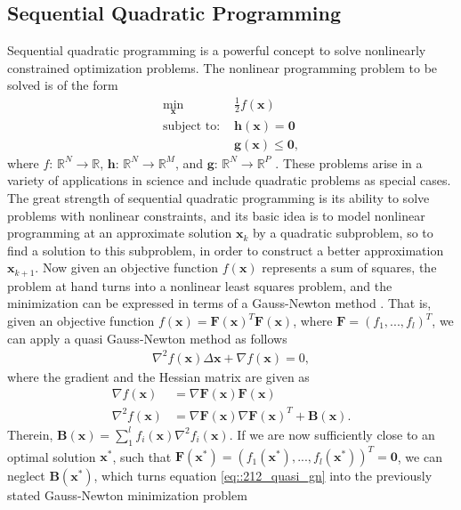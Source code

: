 \subsection{Sequential Quadratic Programming}
\label{sec::212_sqp}
Sequential quadratic programming is a powerful concept to solve nonlinearly constrained optimization problems. The nonlinear programming problem to be solved is of the form
\begin{align}
	\min_{\bm{x}}\, &\frac{1}{2}f(\bm{x})
	\label{eq::212_objective}\\
	\text{subject to: } &\bm{h}(\bm{x}) = \bm{0}\\
	&\bm{g}(\bm{x}) \leq \bm{0},
\end{align}
where $f:\,\mathbb{R}^N\rightarrow\mathbb{R}$, $\bm{h}:\,\mathbb{R}^N\rightarrow\mathbb{R}^M$, and $\bm{g}:\,\mathbb{R}^N\rightarrow\mathbb{R}^P$ \cite{boggs1995sequential}. These problems arise in a variety of applications in science and include quadratic problems as special cases. The great strength of sequential quadratic programming is its ability to solve problems with nonlinear constraints, and its basic idea is to model nonlinear programming at an approximate solution $\bm{x}_k$ by a quadratic subproblem, so to find a solution to this subproblem, in order to construct a better approximation $\bm{x}_{k+1}$. Now given an objective function $f(\bm{x})$ represents a sum of squares, the problem at hand turns into a nonlinear least squares problem, and the minimization can be expressed in terms of a Gauss-Newton method \cite{schittkowski1988solving}. That is, given an objective function $f(\bm{x}) = \bm{F}(\bm{x})^T\bm{F}(\bm{x})$, where $\bm{F}=\left(f_1,...,f_l\right)^T$, we can apply a quasi Gauss-Newton method as follows
\begin{align}
	\nabla^2f(\bm{x})\Delta\bm{x} + \nabla f(\bm{x}) = 0,
	\label{eq::212_quasi_gn}
\end{align}
where the gradient and the Hessian matrix are given as
\begin{align}
	\nabla f(\bm{x}) &= \nabla \bm{F}(\bm{x})\bm{F}(\bm{x}) \\
	\nabla^2 f(\bm{x}) &= \nabla \bm{F}(\bm{x})\nabla\bm{F}(\bm{x})^T + \bm{B}(\bm{x}).
\end{align}
Therein, $\bm{B}(\bm{x}) = \sum_1^lf_i(\bm{x})\nabla^2f_i(\bm{x})$. If we are now sufficiently close to an optimal solution $\bm{x}^*$, such that $\bm{F}(\bm{x}^*) = \left(f_1(\bm{x}^*),...,f_l(\bm{x}^*)\right)^T=\bm{0}$, we can neglect $\bm{B}(\bm{x^*})$, which turns equation \ref{eq::212_quasi_gn} into the previously stated Gauss-Newton minimization problem
